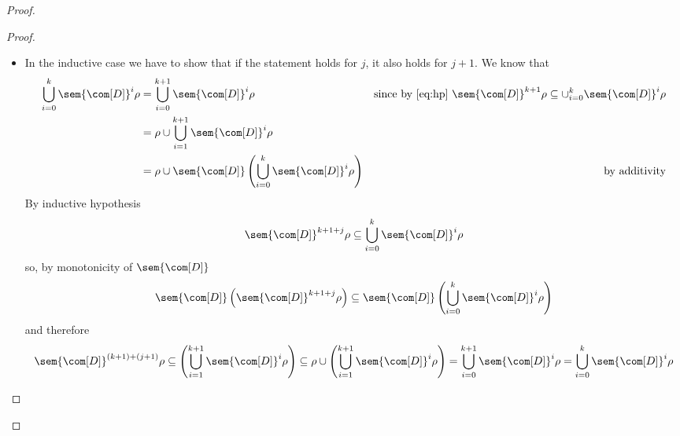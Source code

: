 \begin{proof}
\begin{itemize}
\begin{proof}
\begin{itemize}
      \item In the inductive case we have to show that if the
        statement holds for \(j\), it also holds for \(j+1\). We know
        that
        \begin{align*}
          \bigcup_{i=0}^k\sem{\com[D]}^i\rho & = \bigcup_{i=0}^{k+1}\sem{\com[D]}^i\rho & \text{since by \eqref{eq:hp} } \sem{\com[D]}^{k+1}\rho \subseteq \cup_{i=0}^k\sem{\com[D]}^i\rho \\
                                          & = \rho \cup \bigcup _{i=1}^{k+1}\sem{\com[D]}^i \rho \\
                                          & = \rho \cup \sem{\com[D]}\left( \bigcup _{i=0}^k\sem{\com[D]}^i \rho\right) & \text{by additivity}
        \end{align*}
        By inductive hypothesis
        \begin{equation*}
          \sem{\com[D]}^{k+1+j}\rho \subseteq \bigcup_{i=0}^k\sem{\com[D]}^i\rho
        \end{equation*}
        so, by monotonicity of \(\sem{\com[D]}\)
        \begin{equation*}
          \sem{\com[D]}\left( \sem{\com[D]}^{k+1+j}\rho\right) \subseteq \sem{\com[D]}\left(\bigcup_{i=0}^k\sem{\com[D]}^i\rho \right)
        \end{equation*}
        and therefore
        \begin{equation*}
          \sem{\com[D]}^{(k+1)+(j+1)}\rho \subseteq \left(\bigcup_{i=1}^{k+1}\sem{\com[D]}^i\rho \right) \subseteq \rho \cup \left(\bigcup_{i=1}^{k+1}\sem{\com[D]}^i\rho \right) = \bigcup_{i=0}^{k+1}\sem{\com[D]}^i\rho = \bigcup_{i=0}^{k}\sem{\com[D]}^i\rho
        \end{equation*}
      \end{itemize}
    \end{proof}


\end{itemize}
\end{proof}
